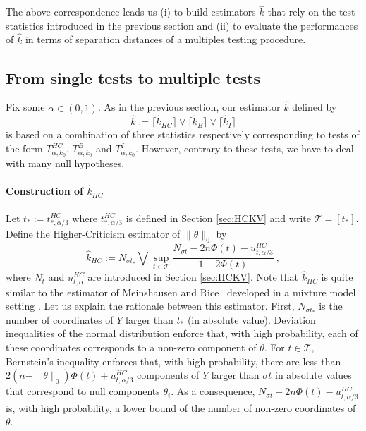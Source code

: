 \documentclass[twoside,11pt]{article}
\def\beq{\begin{equation}}
\def\eeq{\end{equation}}
\def\cT{\mathcal{T}}
\newcommand{\<}{\langle}
\renewcommand{\>}{\rangle}
\begin{document}
The above correspondence leads us (i) to build estimators $\widehat{k}$ that rely on the test statistics introduced in the previous section and (ii) to evaluate the performances of $\widehat{k}$ in terms of separation distances of a multiples testing procedure. 








\subsection{From single tests to multiple tests }

Fix some $\alpha\in (0,1)$.  As in the previous section, our estimator $\widehat{k}$ defined by 
\beq \label{eq:estimation_sparsity}
\widehat{k}:= \lceil\widehat{k}_{HC}\rceil \vee \lceil\widehat{k}_{B}\rceil \vee \lceil\widehat{k}_{I}\rceil
\eeq
is based on a combination of three statistics respectively corresponding to tests of the form  $T^{HC}_{\alpha,k_0}$, $T^{B}_{\alpha,k_0}$ and $T^{I}_{\alpha,k_0}$. However, contrary to these tests, we have to deal with  many null hypotheses.








\paragraph{Construction of $\widehat{k}_{HC}$}
Let $t_{*}:= t_{*,\alpha/3}^{HC}$ where $t_{*,\alpha/3}^{HC}$ is defined in Section \ref{sec:HCKV} and write $\cT=[t_*]$. Define the Higher-Criticism estimator of $\|\theta\|_0$ by 
\beq\label{eq:def_est_HC}
\widehat{k}_{HC} :=  N_{\sigma t_{*}} \bigvee\sup_{t\in \cT}  \frac{N_{\sigma t}- 2n\Phi(t)- u^{HC}_{t,\alpha/3}}{1-2\Phi(t)} \ ,
\eeq 
where $N_t$ and $u^{HC}_{t,\alpha}$ are introduced in Section \ref{sec:HCKV}. Note that $\widehat{k}_{HC}$ is quite similar to the estimator of Meinshausen and Rice~\cite{MR2275246} developed in a mixture model setting . Let us explain the rationale between this estimator. First, $N_{\sigma t_*}$ is the number of coordinates of $Y$ larger than $t_*$ (in absolute value). Deviation inequalities of the normal distribution enforce that, with high probability, each of these coordinates corresponds to a non-zero component of $\theta$. For $t\in \cT$,  Bernstein's inequality enforces that, with high probability, there are less than $2(n-\|\theta\|_0)\Phi(t)+ u^{HC}_{t,\alpha/3}$ components of $Y$ larger than $\sigma t$ in absolute values that correspond to null components $\theta_i$. As a consequence, $N_{\sigma t}- 2n\Phi(t)- u^{HC}_{t,\alpha/3}$ is, with high probability, a lower bound of the number of non-zero coordinates of $\theta$.
\end{document}
